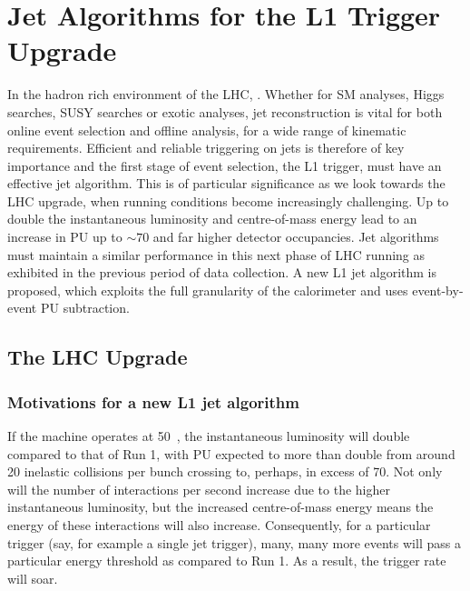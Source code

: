 \chapter{Jet Algorithms for the L1 Trigger Upgrade}
\label{chap:l1jets}

In the hadron rich environment of the \ac{LHC}, . 
Whether for \ac{SM} analyses, Higgs searches, \ac{SUSY} searches or exotic analyses,
jet reconstruction is vital for both online event selection and offline analysis, for a wide range of kinematic requirements.
Efficient and reliable triggering on jets is therefore of key importance
and the first stage of event selection, the \ac{L1} trigger, must have an effective jet algorithm. 
This is of particular significance as we look towards the \ac{LHC} upgrade, when running conditions become increasingly challenging. 
Up to double the instantaneous luminosity and centre-of-mass energy lead to an increase in \ac{PU} up to $\sim 70$ and far higher detector occupancies.
Jet algorithms must maintain a similar performance in this next phase of \ac{LHC} running as exhibited in the previous period of data collection.
A new \ac{L1} jet algorithm is proposed, which exploits the full granularity of the calorimeter and uses event-by-event \ac{PU} subtraction. 

\section{The LHC Upgrade\label{sec:LHCupgrade}}



\subsection{Motivations for a new L1 jet algorithm}

If the machine operates at 50~\ns, the instantaneous luminosity will double compared to that of Run 1, with PU expected to more than double from around 20 inelastic collisions per bunch crossing to, perhaps, in excess of 70.
Not only will the number of interactions per second increase due to the higher instantaneous luminosity, but the increased centre-of-mass energy means the energy of these interactions will also increase. 
Consequently, for a particular trigger (say, for example a single jet trigger), many, many more events will pass a particular energy threshold as compared to Run 1. 
As a result, the trigger rate will soar.

